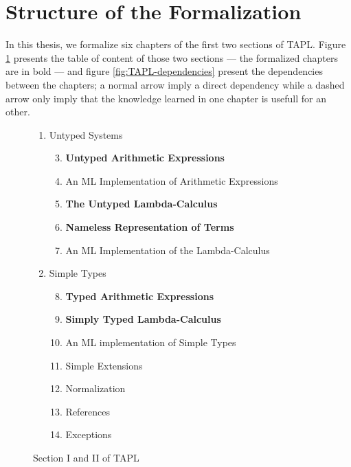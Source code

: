 \section{Structure of the Formalization}
\label{sec:structure-of-formalization}

In this thesis, we formalize six chapters of the first two sections of TAPL. Figure
\ref{fig:TAPL-toc} presents the table of content of those two sections --- the formalized chapters
are in bold --- and figure \ref{fig:TAPL-dependencies} present the dependencies between the
chapters; a normal arrow imply a direct dependency while a dashed arrow only imply that the
knowledge learned in one chapter is usefull for an other.

\begin{figure}[h]
  \footnotesize
  \centering
  \begin{varwidth}{\textwidth}
    \begin{enumerate}[label=\Roman*]
      \itemsep 1pt
      \item Untyped Systems \hfill
        \begin{enumerate}[label=§ \arabic*]
          \setcounter{enumii}{2}
          \item \textbf{Untyped Arithmetic Expressions}
          \item An ML Implementation of Arithmetic Expressions
          \item \textbf{The Untyped Lambda-Calculus}
          \item \textbf{Nameless Representation of Terms}
          \item An ML Implementation of the Lambda-Calculus
        \end{enumerate}
      \item Simple Types \hfill
        \begin{enumerate}[label=§ \arabic*]
          \setcounter{enumii}{7}
          \item \textbf{Typed Arithmetic Expressions}
          \item \textbf{Simply Typed Lambda-Calculus}
          \item An ML implementation of Simple Types
          \item Simple Extensions
          \item Normalization
          \item References
          \item Exceptions
        \end{enumerate}
    \end{enumerate}
  \end{varwidth}
  \caption{Section I and II of TAPL}
  \label{fig:TAPL-toc}
\end{figure}

